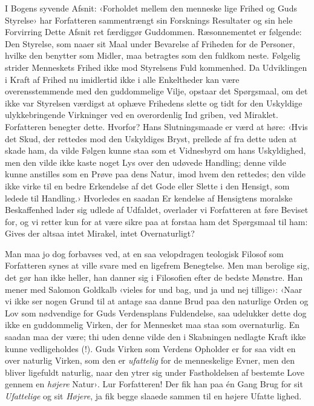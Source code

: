 \documentclass[12pt,a4paper,openany]{book}
\newcommand{\opage}[1]{\marginnote{\footnotesize\textit{[#1]}}}
\begin{document}
I Bogens syvende Afsnit: ‹Forholdet mellem den menneske\-%
lige Frihed og Guds Styrelse› har Forfatteren sammentrængt sin
Forsknings Resultater og sin hele Forvirring Dette Afsnit ret\-%
færdiggør Guddommen. Ræsonnementet er følgende: Den Styrelse,
som naaer sit Maal under Bevarelse af Friheden for de Personer,
hvilke den benytter som Midler, maa betragtes som den fuldkom\-%
neste. Følgelig strider Menneskets Frihed ikke mod Styrelsens Fuld\-%
kommenhed. Da Udviklingen i Kraft af Frihed nu imidlertid
ikke i alle Enkeltheder kan være overensstemmende med den
guddommelige Vilje, opstaar det Spørgsmaal, om det ikke var
Styrelsen værdigst at ophæve Frihedens slette og tidt for den
Uskyldige ulykkebringende Virkninger ved en overordenlig Ind\-%
griben, ved Miraklet. Forfatteren benegter dette. Hvorfor?
\opage{25}Hans Slutningsmaade er værd at høre: ‹Hvis det Skud, der
rettedes mod den Uskyldiges Bryst, prellede af fra dette uden
at skade ham, da vilde Følgen kunne staa som et Vidnesbyrd
om hans Uskyldighed, men den vilde ikke kaste noget Lys over
den udøvede Handling; denne vilde kunne anstilles som en
Prøve paa dens Natur, imod hvem den rettedes; den vilde ikke
virke til en bedre Erkendelse af det Gode eller Slette i den
Hensigt, som ledede til Handling.› Hvorledes en saadan Er\-%
kendelse af Hensigtens moralske Beskaffenhed lader sig udlede
af Udfaldet, overlader vi Forfatteren at føre Beviset for, og vi
retter kun for at være sikre paa at forstaa ham det Spørgsmaal
til ham: Gives der altsaa intet Mirakel, intet Overnaturligt?

Man maa jo dog forbavses ved, at en saa velopdragen teologisk
Filosof som Forfatteren synes at ville svare med en ligefrem
Benegtelse. Men man berolige sig, det gør han ikke heller,
han danner sig i Filosofien efter de bedste Mønstre. Han
mener med Salomon Goldkalb ‹vieles for und bag, und ja und
nej tillige›: ‹Naar vi ikke ser nogen Grund til at antage saa\-%
danne Brud paa den naturlige Orden og Lov som nødvendige
for Guds Verdensplans Fuldendelse, saa udelukker dette dog
ikke en guddommelig Virken, der for Mennesket maa staa som
overnaturlig. En saadan maa der være; thi uden denne vilde
den i Skabningen nedlagte Kraft ikke kunne vedligeholdes (!).
Guds Virken som Verdens Opholder er for saa vidt en over\-%
naturlig Virken, som den er \emph{ufattelig} for de menneskelige Evner,
men den bliver ligefuldt naturlig, naar den ytrer sig under
Fastholdelsen af bestemte Love gennem en \emph{højere} Natur›. Lur
Forfatteren! Der fik han paa én Gang Brug for sit \emph{Ufattelige} og
sit \emph{Højere}, ja fik begge slaaede sammen til en højere Ufatte\-%
lighed.
\end{document}
